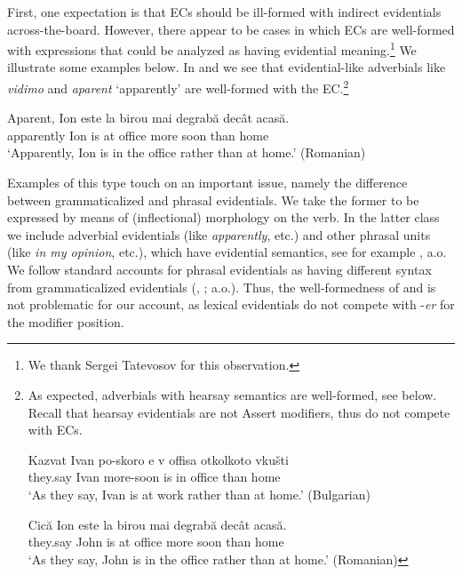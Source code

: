 \documentclass[output=paper,
]{langscibook}
\begin{document}
First, one expectation is that ECs should be ill-formed with indirect evidentials across-the-board. However, there appear to be cases in which ECs are well-formed with expressions that could be analyzed as having evidential meaning.\footnote{We thank Sergei Tatevosov for this observation.}
We illustrate some examples below. In  and  we see that evidential-like adverbials like \textit{vidimo} and \textit{aparent} `apparently' are well-formed with the EC.\footnote{As expected, adverbials with hearsay semantics are well-formed, see below. Recall that hearsay evidentials are not Assert modifiers, thus do not compete with ECs.

	\ea \gll Kazvat Ivan po-skoro e v offisa otkolkoto  vkušti \\
	they.say Ivan	more-soon is 	in	office	than home \\ 
	\glt `As they say, Ivan is at work rather than at home.' \hfill (Bulgarian)
	\z
	
    \ea \gll Cică Ion este la birou mai degrabă decât acasă. \\
	they.say John is at office more soon than home\\ 
	\glt `As they say, John is in the office rather than at home.' \hfill (Romanian)
	\z
	
	}

	 \label{lexevidbul}
    \z 

	\ea \gll Aparent, Ion este la birou mai degrabă decât acasă. \\
	apparently Ion is at office more soon than home\\
	\glt `Apparently, Ion is in the office rather than at home.' \hfill (Romanian)\label{lexevidrom}
    \z 

\noindent Examples of this type touch on an important issue, namely the difference between grammaticalized and phrasal evidentials. We take the former to be expressed by means of (inflectional) morphology on the verb. In the latter class we include adverbial evidentials (like \textit{apparently}, etc.) and other phrasal units (like \textit{in my opinion}, etc.), which have evidential semantics, see for example \citealt{aikh14}, a.o. We follow standard accounts for phrasal evidentials as having different syntax from grammaticalized evidentials (\citealt{fall02}, \citealt{aikh14}; a.o.). Thus, the well-formedness of  and  is not problematic for our account, as lexical evidentials do not compete with -\textit{er} for the  modifier position.
\end{document}
